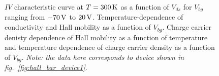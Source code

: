 \begin{figure}[ht]
	\qquad
	\caption[Output characteristics and channel properties of lightly $p$-doped  with 2D/2D contacts]{\protect{} $IV$ characteristic curve at $T=300\,\mathrm{K}$ as a function of $V_{ds}$ for $V_{bg}$ ranging from $-70\,\mathrm{V}$ to $20\,\mathrm{V}$. \protect{} Temperature-dependence of conductivity and \protect{} Hall mobility as a function of $V_{bg}$. \protect{} Charge carrier denisty dependence of Hall mobility as a function of temperature and \protect{} temperature dependence of charge carrier density as a function of $V_{bg}$. \emph{Note: the data here corresponds to device shown in fig.~\ref{fig:hall_bar_device1}}.}
	\label{fig:hall_measurement_data_lightly}
\end{figure}

